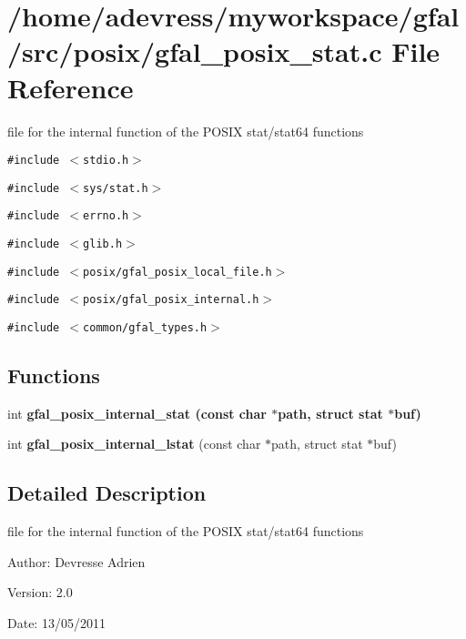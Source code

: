 \section{/home/adevress/myworkspace/gfal/src/posix/gfal\_\-posix\_\-stat.c File Reference}
\label{gfal__posix__stat_8c}
file for the internal function of the POSIX stat/stat64 functions 

{\tt \#include $<$stdio.h$>$}\par
{\tt \#include $<$sys/stat.h$>$}\par
{\tt \#include $<$errno.h$>$}\par
{\tt \#include $<$glib.h$>$}\par
{\tt \#include $<$posix/gfal\_\-posix\_\-local\_\-file.h$>$}\par
{\tt \#include $<$posix/gfal\_\-posix\_\-internal.h$>$}\par
{\tt \#include $<$common/gfal\_\-types.h$>$}\par
\subsection*{Functions}
\begin{CompactItemize}
\item 
int \bf{gfal\_\-posix\_\-internal\_\-stat} (const char $\ast$path, struct stat $\ast$buf)
\item 
int \textbf{gfal\_\-posix\_\-internal\_\-lstat} (const char $\ast$path, struct stat $\ast$buf)\label{gfal__posix__stat_8c_ec4c6fc5e973e8fdb29bbff0a0fb096d}

\end{CompactItemize}


\subsection{Detailed Description}
file for the internal function of the POSIX stat/stat64 functions 

\begin{Desc}
\item[Author:]Devresse Adrien \end{Desc}
\begin{Desc}
\item[Version:]2.0 \end{Desc}
\begin{Desc}
\item[Date:]13/05/2011 \end{Desc}


